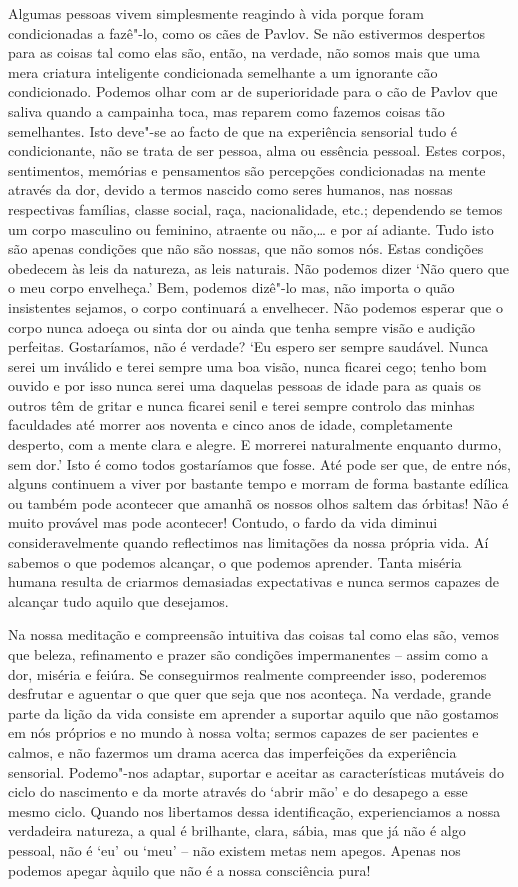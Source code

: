 Algumas pessoas vivem simplesmente reagindo à vida porque foram
condicionadas a fazê"-lo, como os cães de Pavlov. Se não estivermos
despertos para as coisas tal como elas são, então, na verdade, não somos
mais que uma mera criatura inteligente condicionada semelhante a um
ignorante cão condicionado. Podemos olhar com ar de superioridade para o
cão de Pavlov que saliva quando a campainha toca, mas reparem como
fazemos coisas tão semelhantes. Isto deve"-se ao facto de que na
experiência sensorial tudo é condicionante, não se trata de ser pessoa,
alma ou essência pessoal. Estes corpos, sentimentos, memórias e
pensamentos são percepções condicionadas na mente através da dor, devido
a termos nascido como seres humanos, nas nossas respectivas famílias,
classe social, raça, nacionalidade, etc.; dependendo se temos um corpo
masculino ou feminino, atraente ou não,\ldots{} e por aí adiante. Tudo
isto são apenas condições que não são nossas, que não somos nós. Estas
condições obedecem às leis da natureza, as leis naturais. Não podemos
dizer `Não quero que o meu corpo envelheça.' Bem, podemos dizê"-lo mas,
não importa o quão insistentes sejamos, o corpo continuará a envelhecer.
Não podemos esperar que o corpo nunca adoeça ou sinta dor ou ainda que
tenha sempre visão e audição perfeitas. Gostaríamos, não é verdade? `Eu
espero ser sempre saudável. Nunca serei um inválido e terei sempre uma
boa visão, nunca ficarei cego; tenho bom ouvido e por isso nunca serei
uma daquelas pessoas de idade para as quais os outros têm de gritar e
nunca ficarei senil e terei sempre controlo das minhas faculdades até
morrer aos noventa e cinco anos de idade, completamente desperto, com a
mente clara e alegre. E morrerei naturalmente enquanto durmo, sem dor.'
Isto é como todos gostaríamos que fosse. Até pode ser que, de entre nós,
alguns continuem a viver por bastante tempo e morram de forma bastante
edílica ou também pode acontecer que amanhã
os nossos olhos saltem das órbitas! Não é muito provável mas pode
acontecer! Contudo, o fardo da vida diminui consideravelmente quando
reflectimos nas limitações da nossa própria vida. Aí sabemos o que
podemos alcançar, o que podemos aprender. Tanta miséria humana resulta
de criarmos demasiadas expectativas e nunca sermos capazes de alcançar
tudo aquilo que desejamos.

Na nossa meditação e compreensão intuitiva das coisas tal como elas são,
vemos que beleza, refinamento e prazer são condições impermanentes --
assim como a dor, miséria e feiúra. Se conseguirmos realmente
compreender isso, poderemos desfrutar e aguentar o que quer que seja que
nos aconteça. Na verdade, grande parte da lição da vida consiste em
aprender a suportar aquilo que não gostamos em nós próprios e no mundo à
nossa volta; sermos capazes de ser pacientes e calmos, e não fazermos um
drama acerca das imperfeições da experiência sensorial. Podemo"-nos
adaptar, suportar e aceitar as características mutáveis do ciclo do
nascimento e da morte através do `abrir mão' e do desapego a esse
mesmo ciclo. Quando nos libertamos dessa identificação, experienciamos a
nossa verdadeira natureza, a qual é brilhante, clara, sábia, mas que já
não é algo pessoal, não é `eu' ou `meu' -- não existem metas nem apegos.
Apenas nos podemos apegar àquilo que não é a nossa consciência pura!

